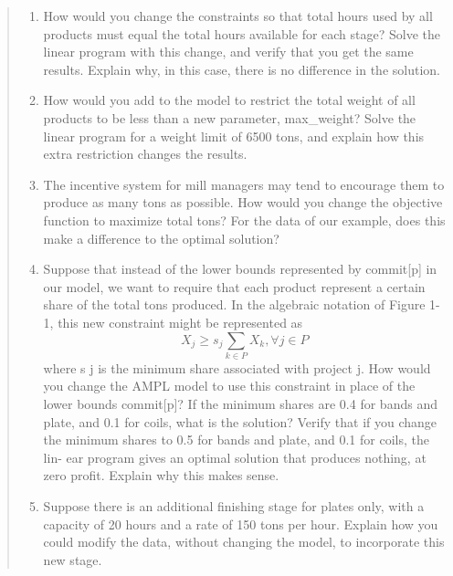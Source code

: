 \documentclass[11pt]{article}
\begin{document}
\begin{enumerate}
\begin{quote}
\begin{enumerate}
\item How would you change the constraints so that total hours used by all products must equal the total hours available for each stage? Solve the linear program with this change, and verify that you
get the same results. Explain why, in this case, there is no difference in the solution.
\item How would you add to the model to restrict the total weight of all products to be less than a
new parameter, max\_weight? Solve the linear program for a weight limit of 6500 tons, and
explain how this extra restriction changes the results.
\item The incentive system for mill managers may tend to encourage them to produce as many tons as
possible. How would you change the objective function to maximize total tons? For the data of
our example, does this make a difference to the optimal solution?
\item Suppose that instead of the lower bounds represented by commit[p] in our model, we want to
require that each product represent a certain share of the total tons produced. In the algebraic notation of Figure 1-1, this new constraint might be represented as
\[
X_j \geq s_j\sum_{k\in P} X_k, \forall j \in P
\]
where s j is the minimum share associated with project j. How would you change the AMPL model
to use this constraint in place of the lower bounds commit[p]? If the minimum shares are 0.4 for
bands and plate, and 0.1 for coils, what is the solution?
Verify that if you change the minimum shares to 0.5 for bands and plate, and 0.1 for coils, the lin-
ear program gives an optimal solution that produces nothing, at zero profit. Explain why this
makes sense.
\item Suppose there is an additional finishing stage for plates only, with a capacity of 20 hours and a
rate of 150 tons per hour. Explain how you could modify the data, without changing the model, to
incorporate this new stage.
\end{enumerate}
\end{quote}

\end{enumerate}
\end{document}
